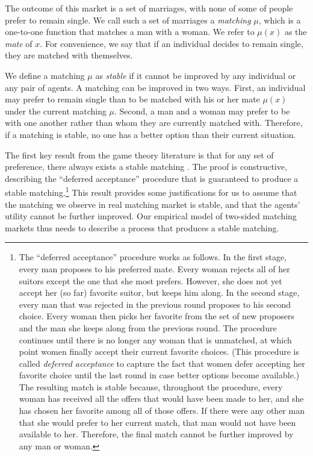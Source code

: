 The outcome of this market is a set of marriages, with none of some of people
prefer to remain single. We call such a set of marriages a \textit{matching}
$\mu$, which is a one-to-one function that matches a man with a woman. We refer
to $\mu(x)$ as the \textit{mate} of $x$. For convenience, we say that if an
individual decides to remain single, they are matched with themselves.

We define a matching $\mu$ as \textit{stable} if it cannot be improved by any
individual or any pair of agents. A matching can be improved in two ways. First,
an individual may prefer to remain single than to be matched with his or her
mate $\mu(x)$ under the current matching $\mu$. Second, a man and a woman may
prefer to be with one another rather than whom they are currently matched with.
Therefore, if a matching is stable, no one has a better option than their
current situation.

The first key result from the game theory literature is that for any set of
preference, there always exists a stable matching \citep{Gale1962}. The proof is
constructive, describing the ``deferred acceptance'' procedure that is
guaranteed to produce a stable matching.\footnote{The ``deferred acceptance''
  procedure works as follows. In the first stage, every man proposes to his
  preferred mate. Every woman rejects all of her suitors except the one that she
  most prefers. However, she does not yet accept her (so far) favorite suitor,
  but keeps him along. In the second stage, every man that was rejected in the
  previous round proposes to his second choice. Every woman then picks her
  favorite from the set of new proposers and the man she keeps along from the
  previous round. The procedure continues until there is no longer any woman
  that is unmatched, at which point women finally accept their current favorite
  choices. (This procedure is called \textit{deferred acceptance} to capture the
  fact that women defer accepting her favorite choice until the last round in
  case better options become available.) The resulting match is stable because,
  throughout the procedure, every woman has received all the offers that would
  have been made to her, and she has chosen her favorite among all of those
  offers. If there were any other man that she would prefer to her current
  match, that man would not have been available to her. Therefore, the final
  match cannot be further improved by any man or woman.} This result provides
some justifications for us to assume that the matching we observe in real
matching market is stable, and that the agents' utility cannot be further
improved. Our empirical model of two-sided matching markets thus needs to
describe a process that produces a stable matching.

